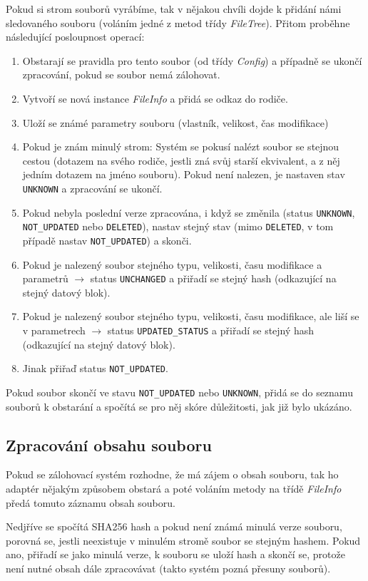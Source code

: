 Pokud si strom souborů vyrábíme, tak v nějakou chvíli dojde k přidání námi
sledovaného souboru (voláním jedné z metod třídy {\it FileTree}). Přitom proběhne
následující posloupnost operací:
\begin{enumerate}
	\item Obstarají se pravidla pro tento soubor (od třídy {\it Config})
	a případně se ukončí zpracování, pokud se soubor nemá zálohovat.
	\item Vytvoří se nová instance {\it FileInfo} a přidá se odkaz do rodiče.
	\item Uloží se známé parametry souboru (vlastník, velikost, čas modifikace)
	\item Pokud je znám minulý strom: Systém se pokusí nalézt soubor se
	stejnou cestou (dotazem na svého rodiče, jestli zná svůj starší
	ekvivalent, a z něj jedním dotazem na jméno souboru). Pokud není nalezen,
	je nastaven stav \texttt{UNKNOWN} a zpracování se ukončí.
	\item Pokud nebyla poslední verze zpracována, i když se změnila (status
	\texttt{UNKNOWN}, \texttt{NOT\_UPDATED} nebo \texttt{DELETED}), nastav
	stejný stav (mimo \texttt{DELETED}, v tom případě nastav
	\texttt{NOT\_UPDATED}) a skonči.
	\item Pokud je nalezený soubor stejného typu, velikosti, času modifikace
	a parametrů $\rightarrow$ status \texttt{UNCHANGED} a přiřadí se stejný hash
	(odkazující na stejný datový blok).
	\item Pokud je nalezený soubor stejného typu, velikosti, času modifikace,
	ale liší se v parametrech $\rightarrow$ status \texttt{UPDATED\_STATUS}
	a přiřadí se stejný hash (odkazující na stejný datový blok).
	\item Jinak přiřaď status \texttt{NOT\_UPDATED}.
\end{enumerate}

Pokud soubor skončí ve stavu \texttt{NOT\_UPDATED} nebo \texttt{UNKNOWN}, přidá
se do seznamu souborů k obstarání a spočítá se pro něj skóre důležitosti, jak
již bylo ukázáno.

\subsection{Zpracování obsahu souboru}

Pokud se zálohovací systém rozhodne, že má zájem o obsah souboru, tak ho adaptér
nějakým způsobem obstará a poté voláním metody na třídě {\it FileInfo} předá
tomuto záznamu obsah souboru.

Nedjříve se spočítá \gls{SHA256} hash a pokud není známá minulá verze souboru,
porovná se, jestli neexistuje v minulém stromě soubor se stejným hashem. Pokud
ano, přiřadí se jako minulá verze, k souboru se uloží hash a skončí se, protože
není nutné obsah dále zpracovávat (takto systém pozná přesuny souborů).

